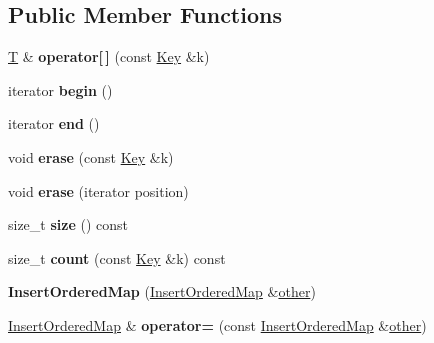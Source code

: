 \subsection*{Public Member Functions}
\begin{DoxyCompactItemize}
\item 
\mbox{\label{struct_c_f_g_1_1_insert_ordered_map_a1a08bb34d426abae6dcba6da31f2b19d}} 
\mbox{\hyperlink{struct_t}{T}} \& {\bfseries operator\mbox{[}$\,$\mbox{]}} (const \mbox{\hyperlink{struct_key}{Key}} \&k)
\item 
\mbox{\label{struct_c_f_g_1_1_insert_ordered_map_af9d01286f594935dba0939975d4e10f6}} 
iterator {\bfseries begin} ()
\item 
\mbox{\label{struct_c_f_g_1_1_insert_ordered_map_a91f8848284a7a2af3d98cb1b68a7e531}} 
iterator {\bfseries end} ()
\item 
\mbox{\label{struct_c_f_g_1_1_insert_ordered_map_aec7b25a0426edff9fe92f1cca98011c2}} 
void {\bfseries erase} (const \mbox{\hyperlink{struct_key}{Key}} \&k)
\item 
\mbox{\label{struct_c_f_g_1_1_insert_ordered_map_abc0b5c8fb6e0ed7c74733fb7d5ab8d36}} 
void {\bfseries erase} (iterator position)
\item 
\mbox{\label{struct_c_f_g_1_1_insert_ordered_map_a1bc26b3800939867b4f36aa061e2a300}} 
size\+\_\+t {\bfseries size} () const
\item 
\mbox{\label{struct_c_f_g_1_1_insert_ordered_map_aabacba8df6f39c873cce61431b6109e0}} 
size\+\_\+t {\bfseries count} (const \mbox{\hyperlink{struct_key}{Key}} \&k) const
\item 
\mbox{\label{struct_c_f_g_1_1_insert_ordered_map_aeaf151775c0eaa4ca6023db989b91d2b}} 
{\bfseries Insert\+Ordered\+Map} (\mbox{\hyperlink{struct_c_f_g_1_1_insert_ordered_map}{Insert\+Ordered\+Map}} \&\mbox{\hyperlink{structother}{other}})
\item 
\mbox{\label{struct_c_f_g_1_1_insert_ordered_map_a488d039ca845de31b99a9fd0ee1c758e}} 
\mbox{\hyperlink{struct_c_f_g_1_1_insert_ordered_map}{Insert\+Ordered\+Map}} \& {\bfseries operator=} (const \mbox{\hyperlink{struct_c_f_g_1_1_insert_ordered_map}{Insert\+Ordered\+Map}} \&\mbox{\hyperlink{structother}{other}})
\end{DoxyCompactItemize}
